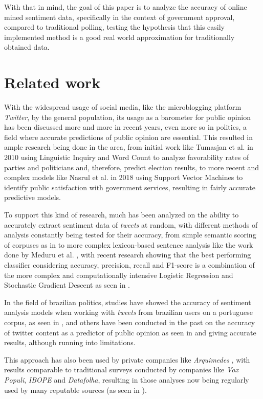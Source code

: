 \documentclass[conference]{IEEEtran}
\begin{document}
With that in mind, the goal of this paper is to analyze the accuracy of online mined sentiment data, specifically in the context of government approval, compared to traditional polling, testing the hypothesis that this easily implemented method is a good real world approximation for traditionally obtained data.

\section{Related work}
\label{sec:orgea818f6}
With the widespread usage of social media, like the microblogging platform \emph{Twitter}, by the general population, its usage as a barometer for public opinion has been discussed more and more in recent years, even more so in politics, a field where accurate predictions of public opinion are essential. This resulted in ample research being done in the area, from initial work like Tumasjan et al. \cite{Tumasjan2010} in 2010 using Linguistic Inquiry and Word Count to analyze favorability rates of parties and politicians and, therefore, predict election results, to more recent and complex models like Nasrul et al. \cite{Aziz2018} in 2018 using Support Vector Machines to identify public satisfaction with government services, resulting in fairly accurate predictive models.

To support this kind of research, much has been analyzed on the ability to accurately extract sentiment data of \emph{tweets} at random, with different methods of analysis constantly being tested for their accuracy, from simple semantic scoring of corpuses as in \cite{Kumar2015} to more complex lexicon-based sentence analysis like the work done by Meduru et al. \cite{opinionTwitter}, with recent research showing that the best performing classifier considering accuracy, precision, recall and F1-score is a combination of the more complex and computationally intensive Logistic Regression and Stochastic Gradient Descent as seen in \cite{Yousaf2021}.

In the field of brazilian politics, studies have showed the accuracy of sentiment analysis models when working with \emph{tweets} from brazilian users on a portuguese corpus, as seen in \cite{Weiand2017}, and others have been conducted in the past on the accuracy of twitter content as a predictor of public opinion as seen in \cite{Oliveira2017} and \cite{Oliveira2019} giving accurate results, although running into limitations.

This approach has also been used by private companies like \emph{Arquimedes} \cite{Arquimedes2021}, with results comparable to traditional surveys conducted by companies like \emph{Vox Populi}, \emph{IBOPE} and \emph{Datafolha}, resulting in those analyses now being regularly used by many reputable sources (as seen in \cite{arquimedesMidia}).
\end{document}
